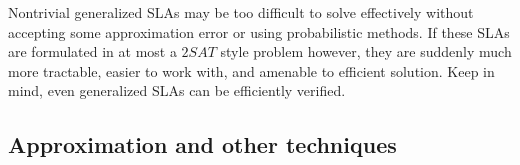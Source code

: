 Nontrivial generalized SLAs may be too difficult to solve effectively without accepting some approximation error or using probabilistic methods.  If these SLAs are formulated in at most a $ 2SAT $ style problem however, they are suddenly much more tractable, easier to work with, and amenable to efficient solution.  Keep in mind, even generalized SLAs can be efficiently verified.

\subsection{Approximation and other techniques}
